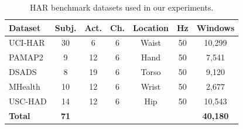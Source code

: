 \begin{table}[t]
\centering
\caption{HAR benchmark datasets used in our experiments.}
\label{tab:datasets}
\begin{tabular}{lcccccc}
\toprule
Dataset & Subj. & Act. & Ch. & Location & Hz & Windows \\
\midrule
UCI-HAR & 30 & 6 & 6 & Waist & 50 & 10,299 \\
PAMAP2 & 9 & 12 & 6 & Hand & 50 & 7,541 \\
DSADS & 8 & 19 & 6 & Torso & 50 & 9,120 \\
MHealth & 10 & 12 & 6 & Wrist & 50 & 2,677 \\
USC-HAD & 14 & 12 & 6 & Hip & 50 & 10,543 \\
\midrule
\textbf{Total} & \textbf{71} & & & & & \textbf{40,180} \\
\bottomrule
\end{tabular}
\end{table}
